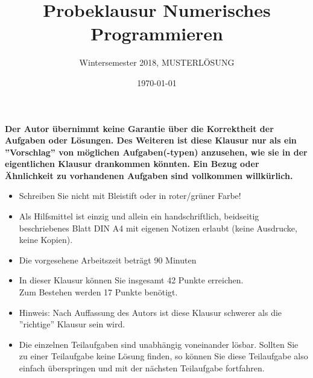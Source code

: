 \documentclass{scrartcl}
\begin{document}
\title{Probeklausur Numerisches Programmieren}
\subtitle{Wintersemester 2018, MUSTERLÖSUNG}
\author{\npauthor{}}
\date{\today}
\maketitle

\textbf{Der Autor übernimmt keine Garantie über die Korrektheit der Aufgaben oder Lösungen. \n Des Weiteren ist diese Klausur nur als ein ''Vorschlag'' von möglichen Aufgaben(-typen) anzusehen, wie sie in der eigentlichen Klausur drankommen könnten. Ein Bezug oder Ähnlichkeit zu vorhandenen Aufgaben sind vollkommen willkürlich.}
\sbreak

\begin{itemize}
	\item Schreiben Sie nicht mit Bleistift oder in roter/grüner Farbe!
	\item Als Hilfsmittel ist einzig und allein ein handschriftlich, beidseitig beschriebenes Blatt DIN A4 mit eigenen Notizen erlaubt (keine Ausdrucke, keine Kopien).
	\item Die vorgesehene Arbeitszeit beträgt 90 Minuten
	\item In dieser Klausur können Sie insgesamt 42 Punkte erreichen. \\Zum Bestehen werden 17 Punkte benötigt.
	\item Hinweis: Nach Auffassung des Autors ist diese Klausur schwerer als die ''richtige'' Klausur sein wird.
	\item Die einzelnen Teilaufgaben sind unabhängig voneinander lösbar.
	Sollten Sie zu einer Teilaufgabe keine Lösung finden, so können Sie diese Teilaufgabe also einfach überspringen und mit der nächsten Teilaufgabe fortfahren.
\end{itemize}
\end{document}
